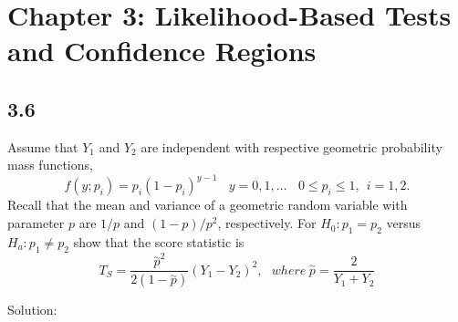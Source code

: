 \documentclass[
  letterpaper,
  DIV=11,
  numbers=noendperiod]{scrreprt}
\begin{document}

\hypertarget{chapter-3-likelihood-based-tests-and-confidence-regions}{%
\chapter{Chapter 3: Likelihood-Based Tests and Confidence
Regions}\label{chapter-3-likelihood-based-tests-and-confidence-regions}}

\hypertarget{section-20}{%
\section{3.6}\label{section-20}}

Assume that \(Y_1\) and \(Y_2\) are independent with respective
geometric probability mass functions,
\[f(y;p_i) = p_i(1-p_i)^{y-1}~~~~y=0,1,\dots~~~~ 0 \leq p_i \leq 1, ~~i=1,2.\]
Recall that the mean and variance of a geometric random variable with
parameter \(p\) are \(1/p\) and \((1-p)/p^2\), respectively. For
\(H_0: p_1=p_2\) versus \(H_a: p_1 \neq p_2\) show that the score
statistic is
\[T_S=\frac{\overset \sim p ^2}{2(1- \overset \sim p)}(Y_1-Y_2)^2, ~~~where~\overset \sim p = \frac 2 {Y_1+Y_2}\]

Solution:
\end{document}
